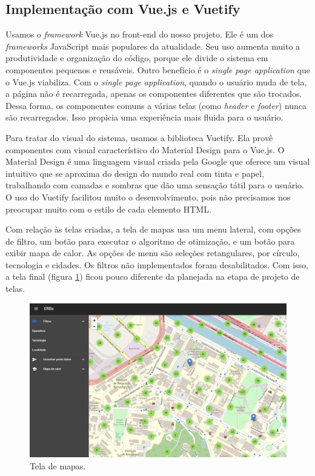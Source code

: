 \documentclass[]{politex}
\begin{document}
\subsection{Implementação com Vue.js e Vuetify}

Usamos o \textit{framework} Vue.js no front-end do nosso projeto. Ele é um dos
\textit{frameworks} JavaScript mais populares da atualidade. Seu uso aumenta
muito a produtividade e organização do código, porque ele divide o sistema em
componentes pequenos e reusáveis. Outro benefício é o \textit{single page application} que o Vue.js viabiliza.
Com o \textit{single page application}, quando o usuário muda de tela, a página não é recarregada, apenas os
componentes diferentes que são trocados. Dessa forma, os componentes comuns a várias telas (como \textit{header} e \textit{footer})
nunca são recarregados. Isso propicia uma experiência mais fluida para o usuário.

Para tratar do visual do sistema, usamos a biblioteca Vuetify. Ela provê componentes
com visual característico do Material Design para o Vue.js. O Material Design é
uma linguagem visual criada pela Google que oferece um visual intuitivo que
se aproxima do design do mundo real com tinta e papel, trabalhando com camadas
e sombras que dão uma sensação tátil para o usuário. O uso do Vuetify facilitou
muito o desenvolvimento, pois não precisamos nos preocupar muito com o estilo de
cada elemento HTML.

Com relação às telas criadas, a tela de mapas usa um menu lateral, com opções de
filtro, um botão para executar o algoritmo de otimização, e um botão para exibir mapa de
calor. As opções de menu são seleções retangulares, por círculo, tecnologia e
cidades. Os filtros não implementados foram desabilitados.
Com isso, a tela final (figura \ref{fig:tela_mapas}) ficou pouco diferente da planejada na etapa de projeto de
telas.

\begin{figure}[H]
    \centering
    \includegraphics[width=6in]{imagens/tela-mapas}
    \caption{Tela de mapas.}
    \label{fig:tela_mapas}
\end{figure}
\end{document}
